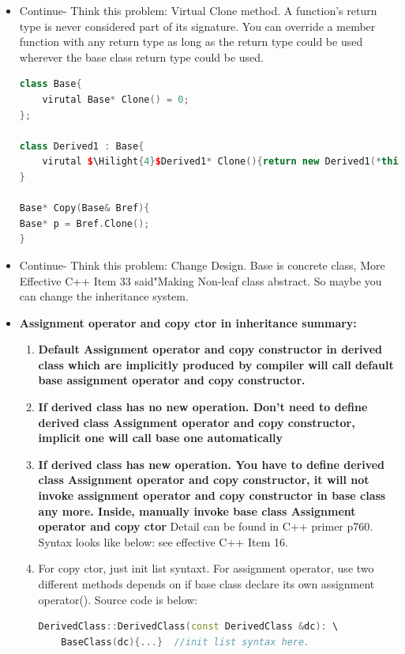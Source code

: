 \documentclass[a4paper,11pt,twoside]{book}
\newcommand{\Hilight}[1]{\makebox[0pt][l]{\color{yellow}\rule[-3pt]{#1em}{11pt}}}
\newcommand{\Hilight}[1]{}
\begin{document}
\begin{itemize}
\item Continue- Think this problem: Virtual Clone method.
	A function's return type is never considered part of its signature. You can override a member function with any return type as long as the return type could be used wherever the base class return type could be used.
\begin{lstlisting}[frame=single, language=c++, mathescape=true]
class Base{
	virutal Base* Clone() = 0;
};
	
class Derived1 : Base{
	virutal $\Hilight{4}$Derived1* Clone(){return new Derived1(*this);}
}
	
Base* Copy(Base& Bref){
Base* p = Bref.Clone();
}
\end{lstlisting}
	
	\item Continue- Think this problem: Change Design. Base is concrete class,  More Effective C++ Item 33 said"Making Non-leaf class abstract. So maybe you can change the inheritance system.
	
	\item \textbf{Assignment operator and copy ctor in inheritance summary:}
	\begin{enumerate}
		\item \textbf{Default Assignment  operator and  copy constructor in derived class which are implicitly produced by compiler will call default base assignment  operator and  copy constructor.}
		
		\item \textbf{If derived class has no new operation. Don't need to define derived class Assignment  operator and  copy constructor, implicit one will call base one automatically}
		
		\item \textbf{If derived class has new operation. You have to define derived class Assignment  operator and  copy constructor, it will not invoke assignment  operator and  copy constructor in base class any more.  Inside, manually invoke base class Assignment operator and copy ctor } Detail can be found in C++ primer p760. Syntax looks like below: see effective C++ Item 16.
		
		\item For copy ctor, just init list syntaxt. For assignment operator, use two different methods depends on if base class declare its own assignment operator(). Source code is below:
		
\begin{lstlisting}[frame=single, language=c++]
DerivedClass::DerivedClass(const DerivedClass &dc): \
	BaseClass(dc){...}  //init list syntax here.
		

\end{lstlisting}
\end{enumerate}
\end{itemize}
\end{document}
